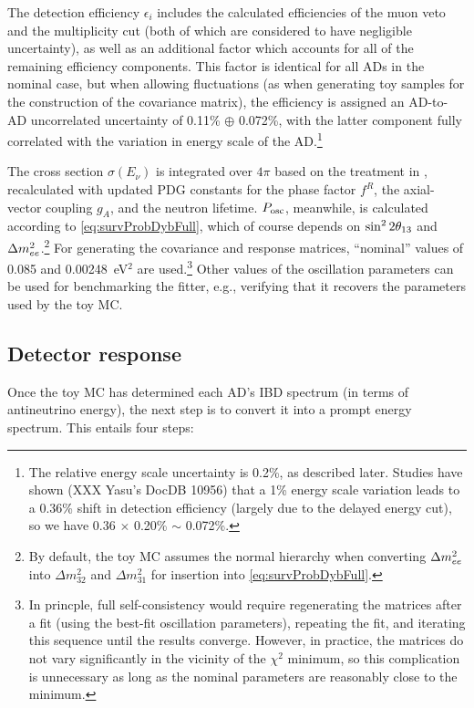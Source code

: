 \documentclass[../thesis.tex]{subfiles}
\begin{document}
The detection efficiency $\epsilon_i$ includes the calculated efficiencies of
the muon veto and the multiplicity cut (both of which are considered to have
negligible uncertainty), as well as an additional factor which accounts for all
of the remaining efficiency components. This factor is identical for all ADs in
the nominal case, but when allowing fluctuations (as when generating toy samples
for the construction of the covariance matrix), the efficiency is assigned an
AD-to-AD uncorrelated uncertainty of 0.11\% $\oplus$ 0.072\%, with the latter
component fully correlated with the variation in energy scale of the
AD.\footnote{The relative energy scale uncertainty is 0.2\%, as described
  later. Studies have shown (XXX Yasu's DocDB 10956) that a 1\% energy scale
  variation leads to a 0.36\% shift in detection efficiency (largely due to the
  delayed energy cut), so we have 0.36 $\times$ 0.20\% $\sim$ 0.072\%.}

The cross section $\sigma(E_\nu)$ is integrated over $4\pi$ based on the
treatment in \cite{Vogel_1999}, recalculated with updated PDG constants for the
phase factor $f^R$, the axial-vector coupling $g_A$, and the neutron
lifetime. $P_\mathrm{osc}$, meanwhile, is calculated according to
\autoref{eq:survProbDybFull}, which of course depends on $\sin^2 2\theta_{13}$ and
$\Delta m^2_{ee}$.\footnote{By default, the toy MC assumes the normal hierarchy when
  converting $\Delta m^2_{ee}$ into $\Delta m^2_{32}$ and $\Delta m^2_{31}$ for
  insertion into \autoref{eq:survProbDybFull}.} For generating the covariance
and response matrices, ``nominal'' values of 0.085 and 0.00248~eV$^2$ are
used.\footnote{In princple, full self-consistency would require regenerating the
  matrices after a fit (using the best-fit oscillation parameters), repeating
  the fit, and iterating this sequence until the results converge. However, in
  practice, the matrices do not vary significantly in the vicinity of the
  $\chi^2$ minimum, so this complication is unnecessary as long as the nominal
  parameters are reasonably close to the minimum.} Other values of the
oscillation parameters can be used for benchmarking the fitter, e.g., verifying
that it recovers the parameters used by the toy MC.

\subsection{Detector response}
\label{sec:fitToyDetResponse}

Once the toy MC has determined each AD's IBD spectrum (in terms of antineutrino
energy), the next step is to convert it into a prompt energy spectrum. This
entails four steps:
\end{document}
